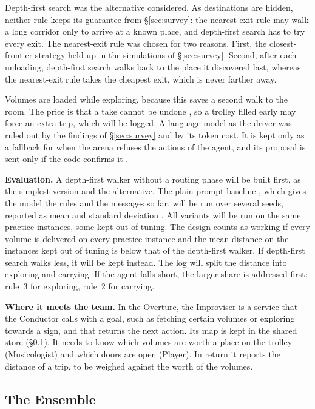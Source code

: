 \documentclass[11pt,a4paper]{article}
\newcommand\secref[1]{\hyperref[#1]{\S\ref*{#1}}}
\newcommand\lead[1]{\vspace{-\parskip}\textbf{#1}}
\begin{document}
Depth-first search was the alternative considered. As destinations are hidden, neither rule keeps its
guarantee from \secref{sec:survey}: the nearest-exit rule may walk a long corridor only to arrive at a known
place, and depth-first search has to try every exit. The nearest-exit rule was chosen for two reasons. First,
the closest-frontier strategy held up in the simulations of \secref{sec:survey}. Second, after each unloading,
depth-first search walks back to the place it discovered last, whereas the nearest-exit rule takes the
cheapest exit, which is never farther away.

Volumes are loaded while exploring, because this saves a second walk to the room. The price is that a take
cannot be undone \parencite{course-api}, so a trolley filled early may force an extra trip, which will be
logged. A language model as the driver was ruled out by the findings of \secref{sec:survey} and by its token
cost. It is kept only as a fallback for when the arena refuses the actions of the agent, and its proposal is
sent only if the code confirms it \parencite{kambhampati2024position}.

\lead{Evaluation.} A depth-first walker without a routing phase will be built first, as the simplest version and the alternative. The plain-prompt baseline \parencite{course-s4}, which gives the model the rules and the messages so far, will be run over several seeds, reported as mean and standard deviation \parencite{hochlehnert2025sober}. All variants will be run on the same practice instances, some kept out of tuning. The design counts as working if every volume is delivered on every practice instance and the mean distance on the instances kept out of tuning is below that of the depth-first walker. If depth-first search walks less, it will be kept instead. The log will split the distance into exploring and carrying. If the agent falls short, the larger share is addressed first: rule~3 for exploring, rule~2 for carrying.

\lead{Where it meets the team.} In the Overture, the Improviser is a service that the Conductor calls with a
goal, such as fetching certain volumes or exploring towards a sign, and that returns the next action. Its map
is kept in the shared store (\secref{sec:ensemble}). It needs to know which volumes are worth a place on the
trolley (Musicologist) and which doors are open (Player). In return it reports the distance of a trip, to be
weighed against the worth of the volumes.

\subsection{The Ensemble}\label{sec:ensemble}
\end{document}
